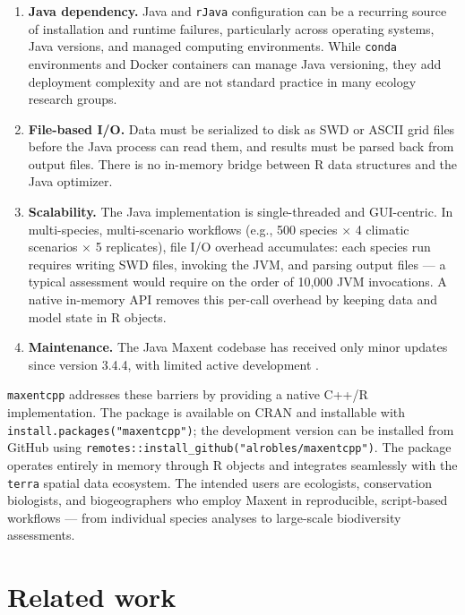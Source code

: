 \documentclass[10pt,letterpaper]{article}
\begin{document}
\begin{enumerate}
\def\labelenumi{\arabic{enumi}.}
\item
  \textbf{Java dependency.} Java and \texttt{rJava} configuration can be
  a recurring source of installation and runtime failures, particularly
  across operating systems, Java versions, and managed computing
  environments. While \texttt{conda} environments and Docker containers
  can manage Java versioning, they add deployment complexity and are not
  standard practice in many ecology research groups.
\item
  \textbf{File-based I/O.} Data must be serialized to disk as SWD or
  ASCII grid files before the Java process can read them, and results
  must be parsed back from output files. There is no in-memory bridge
  between R data structures and the Java optimizer.
\item
  \textbf{Scalability.} The Java implementation is single-threaded and
  GUI-centric. In multi-species, multi-scenario workflows (e.g., 500
  species \(\times\) 4 climatic scenarios \(\times\) 5 replicates), file
  I/O overhead accumulates: each species run requires writing SWD files,
  invoking the JVM, and parsing output files --- a typical assessment
  would require on the order of 10,000 JVM invocations. A native
  in-memory API removes this per-call overhead by keeping data and model
  state in R objects.
\item
  \textbf{Maintenance.} The Java Maxent codebase has received only minor
  updates since version 3.4.4, with limited active development
  \cite{Phillips2017}.
\end{enumerate}

\texttt{maxentcpp} addresses these barriers by providing a native C++/R
implementation. The package is available on CRAN and installable with
\texttt{install.packages("maxentcpp")}; the development version can be
installed from GitHub using
\texttt{remotes::install\_github("alrobles/maxentcpp")}. The package
operates entirely in memory through R objects and integrates seamlessly
with the \texttt{terra} spatial data ecosystem. The intended users are
ecologists, conservation biologists, and biogeographers who employ
Maxent in reproducible, script-based workflows --- from individual
species analyses to large-scale biodiversity assessments.

\section*{Related work}
\end{document}
